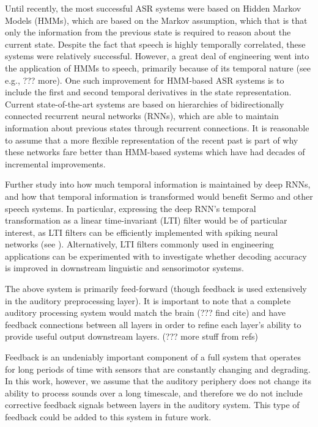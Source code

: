 Until recently,
the most successful ASR systems
were based on Hidden Markov Models (HMMs),
which are based on the Markov assumption,
which that is that only the information
from the previous state is required
to reason about the current state.
Despite the fact that speech is highly temporally correlated,
these systems were relatively successful.
However, a great deal of engineering
went into the application of HMMs
to speech, primarily because of
its temporal nature
(see e.g., \cite{rabiner1989} ??? more).
One such improvement for HMM-based ASR systems
is to include the first and second temporal derivatives
in the state representation.
Current state-of-the-art systems
are based on hierarchies of bidirectionally connected
recurrent neural networks (RNNs),
which are able to maintain information about
previous states through recurrent connections.
It is reasonable to assume that
a more flexible representation
of the recent past
is part of why these networks
fare better than HMM-based systems
which have had decades of incremental improvements.

Further study into how much temporal information
is maintained by deep RNNs,
and how that temporal information is transformed
would benefit Sermo
and other speech systems.
In particular, expressing the deep RNN's
temporal transformation as a
linear time-invariant (LTI) filter
would be of particular interest,
as LTI filters can be efficiently implemented
with spiking neural networks
(see \cite{eliasmith2004}).
Alternatively, LTI filters
commonly used in engineering applications
can be experimented with
to investigate whether decoding accuracy
is improved in downstream
linguistic and sensorimotor systems.

The above system is primarily feed-forward
(though feedback is used extensively in the
auditory preprocessing layer).
It is important to note that
a complete auditory processing system
would match the brain (??? find cite) and have
feedback connections between all layers
in order to refine each layer's ability
to provide useful output downstream layers.
(??? more stuff from refs)

Feedback is an undeniably important
component of a full system that operates
for long periods of time with sensors
that are constantly changing and degrading.
In this work, however, we assume
that the auditory periphery does not change
its ability to process sounds over a long timescale,
and therefore we do not include corrective feedback
signals between layers in the auditory system.
This type of feedback could be added
to this system in future work.

